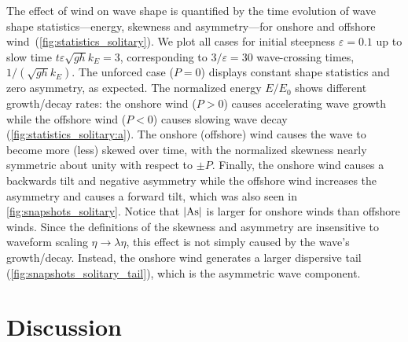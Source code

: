 \documentclass{jfm}
\DeclareMathOperator{\As}{As}
\renewcommand*{\epsilon}{\varepsilon}
\begin{document}
The effect of wind on wave shape is quantified by the time evolution of
wave shape statistics---energy, skewness and asymmetry---for onshore
and offshore wind~(\cref{fig:statistics_solitary}).
We plot all cases for initial steepness $\epsilon = 0.1$ up to slow time
$t \epsilon \sqrt{g h} k_E = 3$, corresponding to $3/\epsilon = 30$
wave-crossing times, $1/(\sqrt{gh} k_E)$.
The unforced case ($P=0$) displays constant shape statistics and zero
asymmetry, as expected.
The normalized energy $E/E_0$ shows different growth/decay rates:
the onshore wind ($P>0$) causes accelerating wave growth while the
offshore wind ($P<0$) causes slowing wave decay
(\cref{fig:statistics_solitary:a}).
The onshore (offshore) wind causes the wave to become more (less) skewed
over time, with the normalized skewness nearly symmetric about unity
with respect to $\pm P$.
Finally, the onshore wind causes a backwards tilt and negative asymmetry
while the offshore wind increases the asymmetry and causes a forward
tilt, which was also seen in \cref{fig:snapshots_solitary}.
Notice that $\abs{\As}$ is larger for onshore winds than offshore winds.
Since the definitions of the skewness and asymmetry are insensitive to
waveform scaling $\eta \to \lambda \eta$, this effect is not simply
caused by the wave's growth/decay.
Instead, the onshore wind generates a larger dispersive tail
(\cref{fig:snapshots_solitary_tail}), which is the asymmetric wave
component.

\section{\label{sec:discussion} Discussion}
\end{document}
